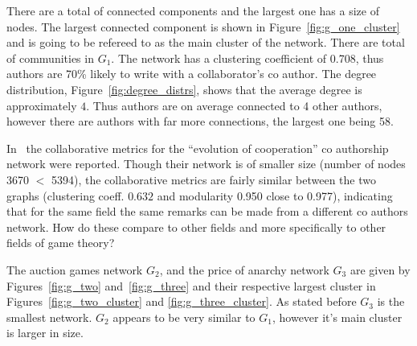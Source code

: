 \documentclass{article}
\theoremstyle{definition}
\newcommand{\connectedcomponents}{}
\newcommand{\communities}{}
\newcommand{\largestcc}{}
\begin{document}
There are a total of \connectedcomponents connected components and the largest
one has a size of \largestcc nodes. The largest connected component is shown in
Figure~\ref{fig:g_one_cluster} and is going to be refereed to as the main
cluster of the network. There are total of \communities communities in \(G_1\).
The network has a clustering coefficient of 0.708, thus authors are 70\%
likely to write with a collaborator's co author. The degree distribution,
Figure~\ref{fig:degree_distrs}, shows that the average degree is approximately
\(4\). Thus authors are on average connected to 4 other authors, however there
are authors with far more connections, the largest one being 58.

In~\cite{Liu2015} the collaborative metrics for the ``evolution of cooperation''
co authorship network were reported. Though their network is of smaller size
(number of nodes 3670 \(<\) 5394), the collaborative metrics are fairly similar
between the two graphs (clustering coeff. \(0.632\) and modularity
0.950 close to 0.977), indicating that for the same field the same
remarks can be made from a different co authors network. How do these compare to other fields
and more specifically to other fields of game theory?

The auction games network \(G_2\), and the price of anarchy network \(G_3\)
are given by Figures~\ref{fig:g_two} and~\ref{fig:g_three} and their respective
largest cluster in Figures~\ref{fig:g_two_cluster} and \ref{fig:g_three_cluster}.
As stated before \(G_3\) is the smallest network. \(G_2\) appears to be
very similar to \(G_1\), however it's main cluster is larger in size.
\end{document}
